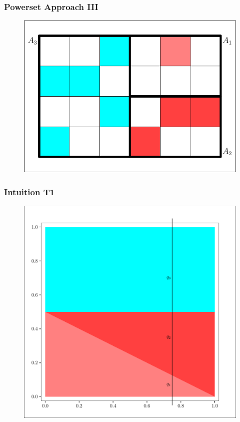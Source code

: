 \documentclass[xcolor=dvipsnames]{beamer}
\begin{document}
\begin{frame}
  \frametitle{Powerset Approach III}
\begin{figure}[h]
\includegraphics[scale=.7]{../diagrams/partition-1.pdf}
\end{figure}
\end{frame}

\begin{frame}
  \frametitle{Intuition T1}
\begin{figure}[h]
\includegraphics[scale=.4]{../diagrams/zeroone-unif.pdf}
\end{figure}
\end{frame}
\end{document}
